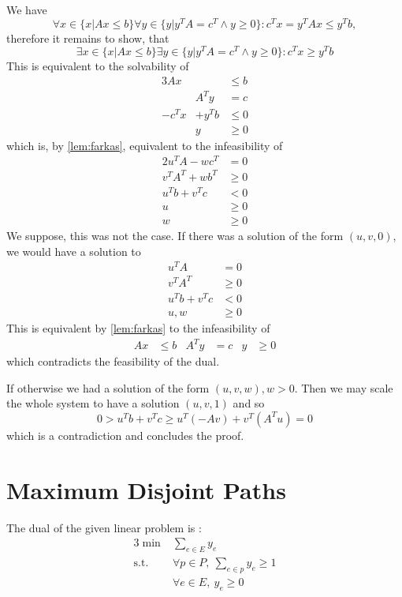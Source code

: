 \documentclass{scrartcl}
\newcommand\1{\mathbf{1}}
\begin{document}
\begin{Proof}
We have
\[
\forall x \in \{x|Ax\le b\} \forall y \in  \{y|y^TA = c^T \wedge y\ge 0\} \colon c^Tx =y^TAx \le y^Tb,
\]
therefore it remains to show, that 
\[
\exists x \in \{x|Ax\le b\} \exists y \in  \{y|y^TA = c^T \wedge y\ge 0\} \colon c^Tx\ge y^Tb
\]
This is equivalent to the solvability of
\begin{alignat*}{3}
A x&& \le b\\
&A^Ty &= c\\
-c^Tx &+ y^Tb &\le 0 \\
&y& \ge 0
\end{alignat*}
which is, by \autoref{lem:farkas}, equivalent to the infeasibility of
\begin{alignat*}{2}
u^TA - wc^T &= 0\\
 v^TA^T + wb^T &\ge 0\\
u^Tb+v^Tc &< 0 \\
 u &\ge 0\\
 w& \ge 0
 \end{alignat*}
We suppose, this was not the case. If there was a solution of the form $(u,v,0)$, we would have a solution to
\begin{align*}
u^TA &= 0\\
v^TA^T &\ge 0 \\
u^T b + v^T c& <0 \\
u, w &\ge 0
\end{align*}
This is equivalent by \autoref{lem:farkas} to the infeasibility of
\begin{align*}
Ax &\le b & A^Ty &= c &y&\ge 0
\end{align*}
which contradicts the feasibility of the dual.

If otherwise we had a solution of the form $(u,v,w), w >0$. Then we may scale the whole system to have a solution $(u,v,1)$ and so
\[
0 > u^T b + v^T c \ge u^T(-Av) + v^T (A^T u) = 0
\]
which is a contradiction and concludes the proof.
\end{Proof}

\section{Maximum Disjoint Paths}

The dual of the given linear problem is :
\begin{alignat*}{3}
\min & \sum_{e \in E} y_e\\
\text{s.t.} & \forall p \in P, \ \sum_{e \in p} y_e \geq 1\\
& \forall e \in E, \  y_e \geq 0
\end{alignat*}
\end{document}
